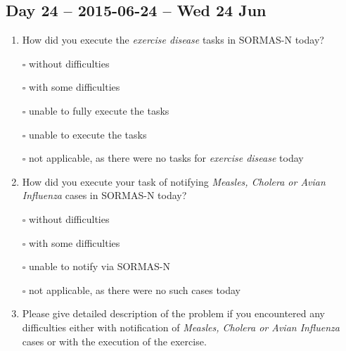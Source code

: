 \documentclass[a4paper, titlepage]{tufte-handout}
\begin{document}
\subsection{Day 24 -- 2015-06-24 -- Wed 24 Jun}
\label{sec-8-18}
\begin{enumerate}
\item How did you execute the \emph{exercise disease} tasks in SORMAS-N today?

\quad $\square$ without difficulties

\quad $\square$ with some difficulties

\quad $\square$ unable to fully execute the tasks

\quad $\square$ unable to execute the tasks

\quad $\square$ not applicable, as there were no tasks for \emph{exercise disease} today

\item How did you execute your task of notifying \emph{Measles, Cholera or Avian Influenza} cases in SORMAS-N today?

\quad $\square$ without difficulties

\quad $\square$ with some difficulties

\quad $\square$ unable to notify via SORMAS-N

\quad $\square$ not applicable, as there were no such cases today

\item Please give detailed description of the problem if you encountered any difficulties either with notification of \emph{Measles, Cholera or Avian Influenza} cases or with the execution of the exercise.

\hrulefill

\hrulefill

\hrulefill

\hrulefill

\hrulefill

\hrulefill

\hrulefill

\hrulefill

\hrulefill

\hrulefill
\end{enumerate}

\newpage
\end{document}
